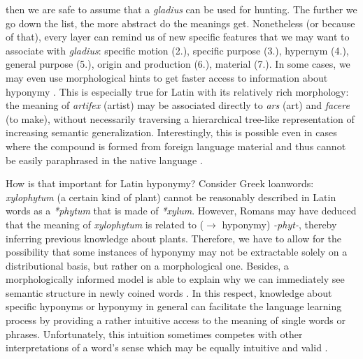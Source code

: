 \documentclass[oneside]{book}
\begin{document}
then we are safe to assume that a \textit{gladius} can be used for hunting. The further we go down the list, the more abstract do the meanings get. Nonetheless (or because of that), every layer can remind us of new specific features that we may want to associate with \textit{gladius}: specific motion (2.), specific purpose (3.), hypernym (4.), general purpose (5.), origin and production (6.), material (7.). In some cases, we may even use morphological hints to get faster access to information about hyponymy \parencite[913]{anstattTypenSemantischerRelationen2009}. This is especially true for Latin with its relatively rich morphology: the meaning of \textit{artifex} (artist) may be associated directly to \textit{ars} (art) and \textit{facere} (to make), without necessarily traversing a hierarchical tree-like representation of increasing semantic generalization. Interestingly, this is possible even in cases where the compound is formed from foreign language material and thus cannot be easily paraphrased in the native language \parencite[33]{souille-rigautSemanticAccountQuasiLexemes2010}. 

How is that important for Latin hyponymy? Consider Greek loanwords: \textit{xylophytum} (a certain kind of plant) cannot be reasonably described in Latin words as a \textit{*phytum} that is made of \textit{*xylum}. However, Romans may have deduced that the meaning of \textit{xylophytum} is related to ($\rightarrow$ hyponymy) \textit{-phyt-}, thereby inferring previous knowledge about plants. Therefore, we have to allow for the possibility that some instances of hyponymy may not be extractable solely on a distributional basis, but rather on a morphological one. Besides, a morphologically informed model is able to explain why we can immediately see semantic structure in newly coined words \parencite[43]{souille-rigautSemanticAccountQuasiLexemes2010}. In this respect, knowledge about specific hyponyms or hyponymy in general can facilitate the language learning process by providing a rather intuitive access to the meaning of single words or phrases. Unfortunately, this intuition sometimes competes with other interpretations of a word's sense which may be equally intuitive and valid \parencite[126]{ponsborderiaPathsGrammaticalizationSpanish2014}. 
\end{document}
